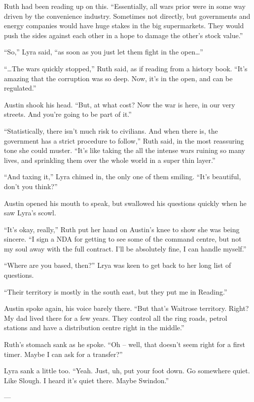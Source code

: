 Ruth had been reading up on this. “Essentially, all wars prior were in some way driven by the convenience industry. Sometimes not directly, but governments and energy companies would have huge stakes in the big supermarkets. They would push the sides against each other in a hope to damage the other’s stock value.”

“So,” Lyra said, “as soon as you just let them fight in the open…”

“…The wars quickly stopped,” Ruth said, as if reading from a history book. “It’s amazing that the corruption was so deep. Now, it’s in the open, and can be regulated.”

Austin shook his head. “But, at what cost? Now the war is here, in our very streets. And you’re going to be part of it.”

“Statistically, there isn’t much risk to civilians. And when there is, the government has a strict procedure to follow,” Ruth said, in the most reassuring tone she could muster. “It’s like taking the all the intense wars ruining so many lives, and sprinkling them over the whole world in a super thin layer.”

“And taxing it,” Lyra chimed in, the only one of them smiling. “It’s beautiful, don’t you think?”

Austin opened his mouth to speak, but swallowed his questions quickly when he saw Lyra’s scowl.

“It’s okay, really,” Ruth put her hand on Austin’s knee to show she was being sincere. “I sign a NDA for getting to see some of the command centre, but not my soul away with the full contract. I’ll be absolutely fine, I can handle myself.”

“Where are you based, then?” Lrya was keen to get back to her long list of questions.

“Their territory is mostly in the south east, but they put me in Reading.”

Austin spoke again, his voice barely there. “But that’s Waitrose territory. Right? My dad lived there for a few years. They control all the ring roads, petrol stations and have a distribution centre right in the middle.”

Ruth’s stomach sank as he spoke. “Oh – well, that doesn’t seem right for a first timer. Maybe I can ask for a transfer?”

Lyra sank a little too. “Yeah. Just, uh, put your foot down. Go somewhere quiet. Like Slough. I heard it’s quiet there. Maybe Swindon.”

---

